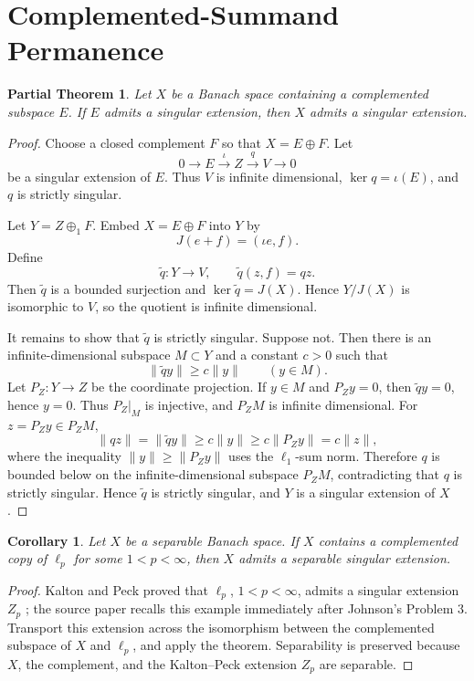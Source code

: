 \documentclass[11pt]{article}
\newtheorem*{theorem}{Partial Theorem}
\newtheorem*{corollary}{Corollary}
\begin{document}
\section*{Complemented-Summand Permanence}

\begin{theorem}
Let \(X\) be a Banach space containing a complemented subspace \(E\). If
\(E\) admits a singular extension, then \(X\) admits a singular extension.
\end{theorem}

\begin{proof}
Choose a closed complement \(F\) so that \(X=E\oplus F\). Let
\[
0\longrightarrow E \xrightarrow{\iota} Z \xrightarrow{q} V
\longrightarrow 0
\]
be a singular extension of \(E\). Thus \(V\) is infinite dimensional,
\(\ker q=\iota(E)\), and \(q\) is strictly singular.

Let \(Y=Z\oplus_1 F\). Embed \(X=E\oplus F\) into \(Y\) by
\[
J(e+f)=(\iota e,f).
\]
Define
\[
\widetilde q:Y\to V,\qquad \widetilde q(z,f)=qz.
\]
Then \(\widetilde q\) is a bounded surjection and
\(\ker \widetilde q=J(X)\). Hence \(Y/J(X)\) is isomorphic to \(V\), so the
quotient is infinite dimensional.

It remains to show that \(\widetilde q\) is strictly singular. Suppose not.
Then there is an infinite-dimensional subspace \(M\subset Y\) and a constant
\(c>0\) such that
\[
\|\widetilde q y\|\ge c\|y\| \qquad (y\in M).
\]
Let \(P_Z:Y\to Z\) be the coordinate projection. If \(y\in M\) and
\(P_Zy=0\), then \(\widetilde qy=0\), hence \(y=0\). Thus \(P_Z|_M\) is
injective, and \(P_ZM\) is infinite dimensional. For \(z=P_Zy\in P_ZM\),
\[
\|qz\|=\|\widetilde qy\|\ge c\|y\|\ge c\|P_Zy\|=c\|z\|,
\]
where the inequality \(\|y\|\ge \|P_Zy\|\) uses the \(\ell_1\)-sum norm.
Therefore \(q\) is
bounded below on the infinite-dimensional subspace \(P_ZM\), contradicting
that \(q\) is strictly singular. Hence \(\widetilde q\) is strictly singular,
and \(Y\) is a singular extension of \(X\).
\end{proof}

\begin{corollary}
Let \(X\) be a separable Banach space. If \(X\) contains a complemented copy
of \(\ell_p\) for some \(1<p<\infty\), then \(X\) admits a separable singular
extension.
\end{corollary}

\begin{proof}
Kalton and Peck proved that \(\ell_p\), \(1<p<\infty\), admits a singular
extension \(Z_p\) \cite[Theorem 6.4]{KP1979}; the source paper recalls this
example immediately after Johnson's Problem 3. Transport this extension across
the isomorphism between the complemented subspace of \(X\) and \(\ell_p\), and
apply the theorem. Separability is preserved because \(X\), the complement,
and the Kalton--Peck extension \(Z_p\) are separable.
\end{proof}
\end{document}
